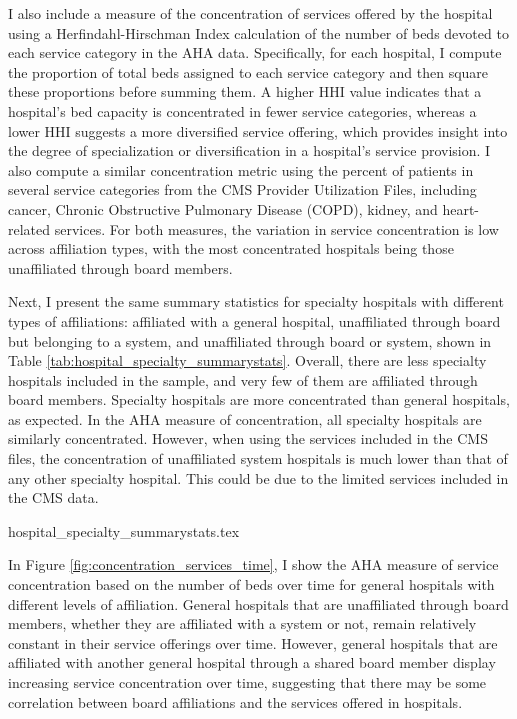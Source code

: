 \documentclass[12pt]{article}
\begin{document}
    I also include a measure of the concentration of services offered by the hospital using a Herfindahl-Hirschman Index calculation of the number of beds devoted to each service category in the AHA data. Specifically, for each hospital, I compute the proportion of total beds assigned to each service category and then square these proportions before summing them. A higher HHI value indicates that a hospital's bed capacity is concentrated in fewer service categories, whereas a lower HHI suggests a more diversified service offering, which provides insight into the degree of specialization or diversification in a hospital’s service provision. I also compute a similar concentration metric using the percent of patients in several service categories from the CMS Provider Utilization Files, including cancer, Chronic Obstructive Pulmonary Disease (COPD), kidney, and heart-related services. For both measures, the variation in service concentration is low across affiliation types, with the most concentrated hospitals being those unaffiliated through board members. 

    Next, I present the same summary statistics for specialty hospitals with different types of affiliations: affiliated with a general hospital, unaffiliated through board but belonging to a system, and unaffiliated through board or system, shown in Table \ref{tab:hospital_specialty_summarystats}. Overall, there are less specialty hospitals included in the sample, and very few of them are affiliated through board members. Specialty hospitals are more concentrated than general hospitals, as expected. In the AHA measure of concentration, all specialty hospitals are similarly concentrated. However, when using the services included in the CMS files, the concentration of unaffiliated system hospitals is much lower than that of any other specialty hospital. This could be due to the limited services included in the CMS data. 

    {hospital_specialty_summarystats.tex}

    In Figure \ref{fig:concentration_services_time}, I show the AHA measure of service concentration based on the number of beds over time for general hospitals with different levels of affiliation. General hospitals that are unaffiliated through board members, whether they are affiliated with a system or not, remain relatively constant in their service offerings over time. However, general hospitals that are affiliated with another general hospital through a shared board member display increasing service concentration over time, suggesting that there may be some correlation between board affiliations and the services offered in hospitals.  
\end{document}
